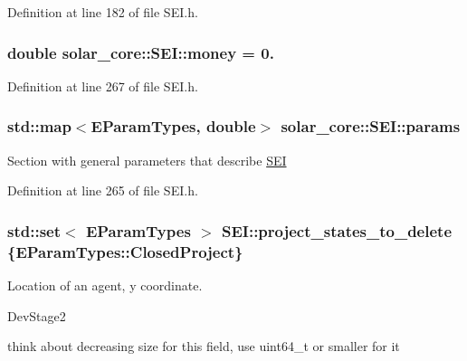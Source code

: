 Definition at line 182 of file S\+E\+I.\+h.

\hypertarget{classsolar__core_1_1_s_e_i_a8ab5ab03ef726a3354b7c0e0d18da82a}{}
\subsubsection[{money}]{\setlength{\rightskip}{0pt plus 5cm}double solar\+\_\+core\+::\+S\+E\+I\+::money = 0.\hspace{0.3cm}{\ttfamily [protected]}}\label{classsolar__core_1_1_s_e_i_a8ab5ab03ef726a3354b7c0e0d18da82a}


Definition at line 267 of file S\+E\+I.\+h.

\hypertarget{classsolar__core_1_1_s_e_i_a811b998092171224983f9aefaa974707}{}
\subsubsection[{params}]{\setlength{\rightskip}{0pt plus 5cm}std\+::map$<${\bf E\+Param\+Types}, double$>$ solar\+\_\+core\+::\+S\+E\+I\+::params\hspace{0.3cm}{\ttfamily [protected]}}\label{classsolar__core_1_1_s_e_i_a811b998092171224983f9aefaa974707}
Section with general parameters that describe \hyperlink{classsolar__core_1_1_s_e_i}{S\+E\+I} 

Definition at line 265 of file S\+E\+I.\+h.

\hypertarget{classsolar__core_1_1_s_e_i_a41711b0f344d6f29ea48dbcdb08b9c4e}{}
\subsubsection[{project\+\_\+states\+\_\+to\+\_\+delete}]{\setlength{\rightskip}{0pt plus 5cm}std\+::set$<$ {\bf E\+Param\+Types} $>$ S\+E\+I\+::project\+\_\+states\+\_\+to\+\_\+delete \{{\bf E\+Param\+Types\+::\+Closed\+Project}\}\hspace{0.3cm}{\ttfamily [static]}}\label{classsolar__core_1_1_s_e_i_a41711b0f344d6f29ea48dbcdb08b9c4e}
Location of an agent, y coordinate.\begin{DoxyRefDesc}{Dev\+Stage2}
\item[\hyperlink{_dev_stage2__DevStage2000019}{Dev\+Stage2}]think about decreasing size for this field, use uint64\+\_\+t or smaller for it \end{DoxyRefDesc}


